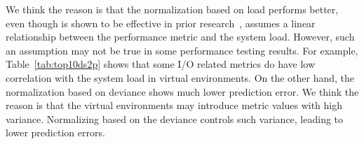 We think the reason is that the normalization based on load performs better, even though is shown to be effective in prior research~\cite{Nguyen:2012:ADP:2188286.2188344}, assumes a linear relationship between the performance metric and the system load. However, such an assumption may not be true in some performance testing results. For example, Table~\ref{tab:top10ds2p} shows that some I/O related metrics do have low correlation with the system load in virtual environments. On the other hand, the normalization based on deviance shows much lower prediction error. We think the reason is that the virtual environments may introduce metric values with high variance. Normalizing based on the deviance controls such variance, leading to lower prediction errors.







